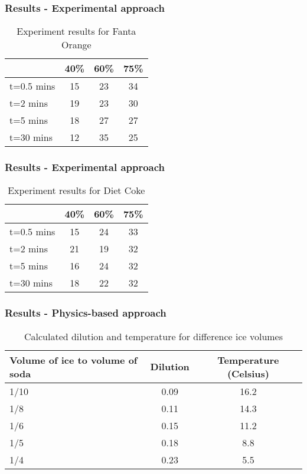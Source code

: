 \documentclass[compress,handout,10pt]{beamer}
\begin{document}
\begin{frame}
    \frametitle{Results - Experimental approach}

\begin{table}[ h]
\centering
\begin{tabular}{ l || c|c|c }
  &40\% &60\% & 75\% \\
\hline  
t=0.5 mins & 15 & 23 & 34\\ 
\hline  
t=2 mins & 19 & 23 & 30\\ 
\hline  
t=5 mins & 18 & 27 & 27\\ 
\hline  
t=30 mins & 12 & 35 & 25\\ 
\hline  
   
 \end{tabular}

\caption{Experiment results for Fanta Orange}

\end{table}
\end{frame}

\begin{frame}
    \frametitle{Results - Experimental approach}
\begin{table}[ h]
\centering
\begin{tabular}{ l || c|c|c}
  &40\% &60\% & 75\%  \\
\hline  
t=0.5 mins & 15 & 24 & 33\\ 
\hline  
t=2 mins & 21& 19 & 32\\ 
\hline  
t=5 mins & 16 & 24 & 32\\ 
\hline  
t=30 mins & 18 & 22& 32\\ 
\hline  
   
 \end{tabular}

\caption{Experiment results for Diet Coke}

\end{table}
\end{frame}

\begin{frame}
    \frametitle{Results - Physics-based approach}
\begin{table}[ h]
\centering
\begin{tabular}{ l || c|c}
 Volume of ice to volume of soda &Dilution &Temperature (Celsius) \\
\hline  
1/10 & 0.09&16.2\\ 
\hline  
1/8 & 0.11&14.3\\ 
\hline 
1/6 & 0.15&11.2\\ 
\hline 
1/5 & 0.18&8.8\\ 
\hline 
1/4 & 0.23&5.5\\ 
\hline 
   
 \end{tabular}

\caption{Calculated dilution and temperature for difference ice volumes}

\end{table}
\end{frame}
 
\end{document}
